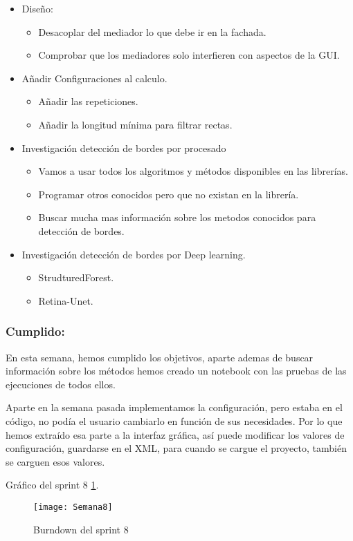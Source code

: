 \begin{itemize}
	\item Diseño:
		\begin{itemize}
			\item Desacoplar del mediador lo que debe ir en la fachada.
			\item Comprobar que los mediadores solo interfieren con aspectos de la GUI.
		\end{itemize}	
	\item Añadir Configuraciones al calculo.
		\begin{itemize}
			\item Añadir las repeticiones.
			\item Añadir la longitud mínima para filtrar rectas.
		\end{itemize}
		\item Investigación detección de bordes por procesado
			\begin{itemize}
				\item Vamos a usar todos los algoritmos y métodos disponibles en las librerías.
				\item Programar otros conocidos pero que no existan en la librería.
				\item Buscar mucha mas información sobre los metodos conocidos para detección de bordes.
			\end{itemize}					
		\item Investigación detección de bordes por Deep learning.
			\begin{itemize}
				\item StrudturedForest.
				\item Retina-Unet. 
			\end{itemize}
\end{itemize}
\subsubsection{Cumplido:}
En esta semana, hemos cumplido los objetivos, aparte ademas de buscar información sobre los métodos hemos creado un notebook con las pruebas de las ejecuciones de todos ellos.

Aparte en la semana pasada implementamos la configuración, pero estaba en el código, no podía el usuario cambiarlo en función de sus necesidades.
Por lo que hemos extraído esa parte a la interfaz gráfica, así puede modificar los valores de configuración, guardarse en el XML, para cuando se cargue el proyecto, también se carguen esos valores.

Gráfico del sprint 8 \ref{fig:A.2.8}.
\begin{figure}[h]
\centering
\texttt{[image: Semana8]}
\caption{Burndown del sprint 8}
\label{fig:A.2.8}
\end{figure}

